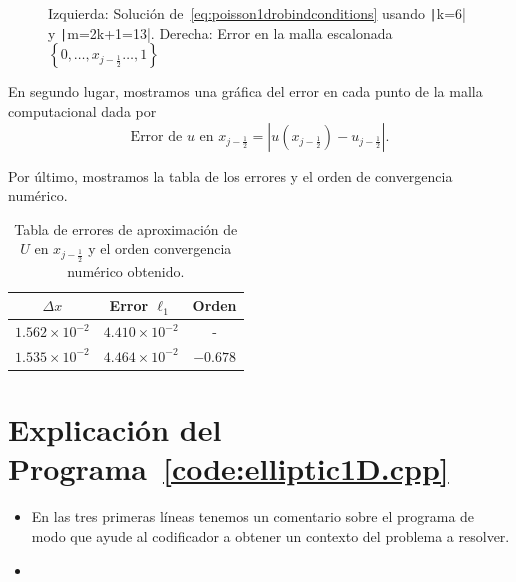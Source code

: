 \begin{problem}
\begin{figure}[ht!]
  \caption{Izquierda: Solución de~\eqref{eq:poisson1drobindconditions}
    usando \texttt|k=6| y \texttt|m=2k+1=13|.
    Derecha: Error en la malla escalonada
    \begin{math}
      \left\{
      0,
      \dotsc,
      x_{j-\frac{1}{2}}
      \dotsc,
      1
      \right\}
    \end{math}}
\end{figure}

En segundo lugar, mostramos una gráfica del error en cada punto de la malla computacional
dada por
\begin{equation*}
  \text{Error de $u$ en $x_{j-\frac{1}{2}}$}=
  \left|
  u\left(x_{j-\frac{1}{2}}\right)-
  u_{j-\frac{1}{2}}
  \right|.
\end{equation*}

Por último, mostramos la tabla de los errores y el orden de convergencia numérico.

\begin{table}[ht!]
  \centering
  \begin{tabular}{ccc}
    \toprule
    $\Delta x$            & Error $\ell_1$        & Orden    \\
    \midrule
    $1.562\times 10^{-2}$ & $4.410\times 10^{-2}$ & -        \\
    $1.535\times 10^{-2}$ & $4.464\times 10^{-2}$ & $-0.678$ \\
    \bottomrule
  \end{tabular}
  \caption{Tabla de errores de aproximación de $U$ en
    $x_{j-\frac{1}{2}}$ y el orden convergencia numérico obtenido.}
  \label{table:errors}
\end{table}


\section*{Explicación del Programa~\ref{code:elliptic1D.cpp}}

\begin{itemize}
  \item

        En las tres primeras líneas tenemos un comentario sobre el
        programa de modo que ayude al codificador a obtener un
        contexto del problema a resolver.

  \item


\end{itemize}
\end{problem}
